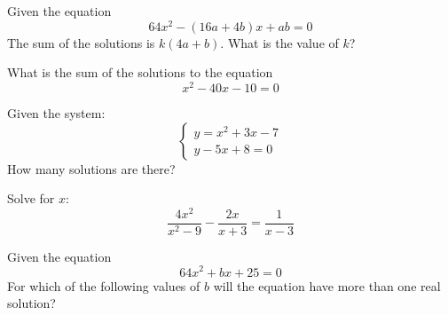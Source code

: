 \vspace{5em}

\noindent\markforreview
\vspace{1em}

Given the equation  
\[
64x^2 - (16a + 4b)x + ab = 0
\]  
The sum of the solutions is \(k(4a + b)\). What is the value of \(k\)?





\vspace{5em}

\noindent\markforreview
\vspace{1em}

What is the sum of the solutions to the equation  
\[
x^2 - 40x - 10 = 0
\]

\vspace{0.75em}


\newpage


\noindent\markforreview
\vspace{1em}

Given the system:  
\[
\begin{cases}
y = x^2 + 3x - 7 \\
y - 5x + 8 = 0
\end{cases}
\]  
How many solutions are there?

\vspace{0.75em}


\vspace{2em}

\noindent\markforreview
\vspace{1em}

Solve for \(x\):  
\[
\frac{4x^2}{x^2 - 9} - \frac{2x}{x + 3} = \frac{1}{x - 3}
\]

\vspace{0.75em}



\newpage


\noindent\markforreview
\vspace{1em}

Given the equation  
\[
64x^2 + bx + 25 = 0
\]  
For which of the following values of \(b\) will the equation have more than one real solution?

